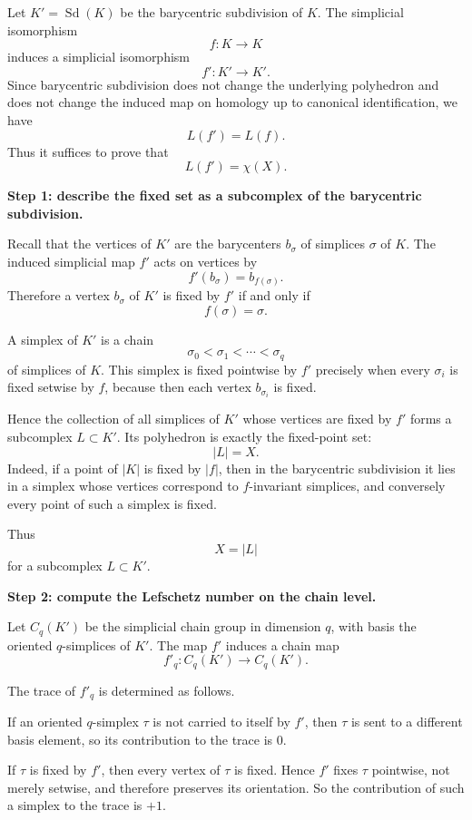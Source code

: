 \begin{solution}
Let \(K'=\operatorname{Sd}(K)\) be the barycentric subdivision of \(K\). The simplicial isomorphism
\[
f:K\to K
\]
induces a simplicial isomorphism
\[
f':K'\to K'.
\]
Since barycentric subdivision does not change the underlying polyhedron and does not change the induced map on homology up to canonical identification, we have
\[
L(f')=L(f).
\]
Thus it suffices to prove that
\[
L(f')=\chi(X).
\]

\par

\textbf{Step 1: describe the fixed set as a subcomplex of the barycentric subdivision.}

Recall that the vertices of \(K'\) are the barycenters \(b_\sigma\) of simplices \(\sigma\) of \(K\). The induced simplicial map \(f'\) acts on vertices by
\[
f'(b_\sigma)=b_{f(\sigma)}.
\]
Therefore a vertex \(b_\sigma\) of \(K'\) is fixed by \(f'\) if and only if
\[
f(\sigma)=\sigma.
\]

A simplex of \(K'\) is a chain
\[
\sigma_0<\sigma_1<\cdots<\sigma_q
\]
of simplices of \(K\). This simplex is fixed pointwise by \(f'\) precisely when every \(\sigma_i\) is fixed setwise by \(f\), because then each vertex \(b_{\sigma_i}\) is fixed.

Hence the collection of all simplices of \(K'\) whose vertices are fixed by \(f'\) forms a subcomplex \(L\subset K'\). Its polyhedron is exactly the fixed-point set:
\[
|L|=X.
\]
Indeed, if a point of \(|K|\) is fixed by \(|f|\), then in the barycentric subdivision it lies in a simplex whose vertices correspond to \(f\)-invariant simplices, and conversely every point of such a simplex is fixed.

Thus
\[
X=|L|
\]
for a subcomplex \(L\subset K'\).

\par

\textbf{Step 2: compute the Lefschetz number on the chain level.}

Let \(C_q(K')\) be the simplicial chain group in dimension \(q\), with basis the oriented \(q\)-simplices of \(K'\). The map \(f'\) induces a chain map
\[
f'_q:C_q(K')\to C_q(K').
\]

The trace of \(f'_q\) is determined as follows.

If an oriented \(q\)-simplex \(\tau\) is not carried to itself by \(f'\), then \(\tau\) is sent to a different basis element, so its contribution to the trace is \(0\).

If \(\tau\) is fixed by \(f'\), then every vertex of \(\tau\) is fixed. Hence \(f'\) fixes \(\tau\) pointwise, not merely setwise, and therefore preserves its orientation. So the contribution of such a simplex to the trace is \(+1\).


\end{solution}
